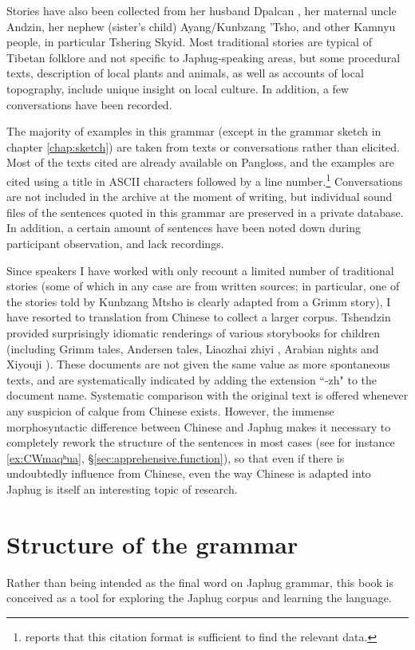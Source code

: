 Stories  have also been collected from her husband  Dpalcan , her maternal uncle Andzin, her nephew (sister's child) Ayang/Kunbzang 'Tsho, and other Kamnyu people, in particular  Tshering Skyid. Most traditional stories are typical of Tibetan folklore and not specific to Japhug-speaking areas, but some procedural texts, description of local plants and animals, as well as accounts of local topography, include unique insight on local culture. In addition, a few conversations have been recorded.
 
The majority of examples in this grammar (except in the grammar sketch in chapter \ref{chap:sketch}) are taken from texts or conversations rather than elicited. Most of the texts cited are already available on Pangloss, and the examples are cited using a title in ASCII characters followed by a line number.\footnote{ \citet[305]{hill17statest} reports that this citation format is sufficient to find the relevant data. } Conversations are not included in the archive at the moment of writing, but individual sound files of the sentences quoted in this grammar are preserved in a private database. In addition, a certain amount of sentences have been noted down during participant observation, and lack recordings.
 
Since speakers I have worked with only recount a limited number of traditional stories (some of which in any case are from written sources; in particular, one of the stories told by Kunbzang Mtsho is clearly adapted from a Grimm story), I have resorted to translation from Chinese to collect a larger corpus. Tshendzin provided surprisingly idiomatic renderings of various storybooks for children (including Grimm tales, Andersen tales, Liaozhai zhiyi , Arabian nights and Xiyouji ). These documents are not given the same value as more spontaneous texts, and are systematically indicated  by adding the extension ``-zh" to the document name. Systematic comparison with the original text is offered whenever any suspicion of calque from Chinese exists. However, the immense morphosyntactic difference between Chinese and Japhug makes it necessary to completely rework the structure of the sentences in most cases (see for instance \ref{ex:CWmaqʰua}, §\ref{sec:apprehensive.function}), so that even if there is undoubtedly influence from Chinese, even the way Chinese is adapted into Japhug is itself an interesting topic of research.



\section{Structure of the grammar}
Rather than being intended as the final word on Japhug grammar, this book is conceived as a tool for exploring  the Japhug corpus and learning the language. 

